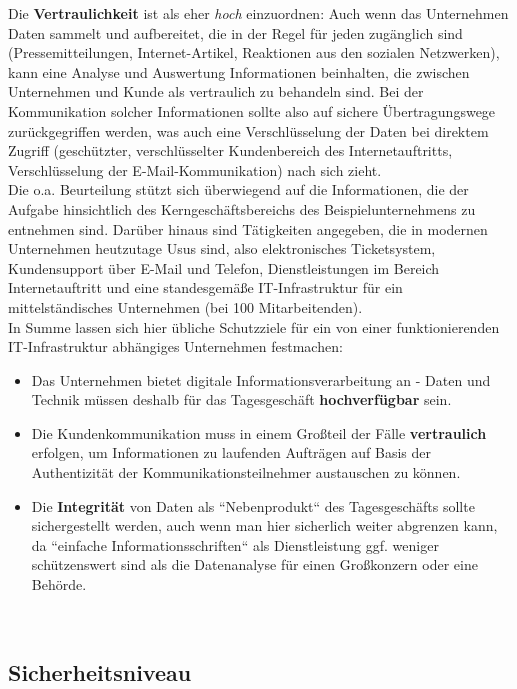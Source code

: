 Die \textbf{Vertraulichkeit} ist als eher \textit{hoch} einzuordnen: Auch wenn das Unternehmen Daten sammelt und aufbereitet, die in der Regel für jeden zugänglich sind (Pressemitteilungen, Internet-Artikel, Reaktionen aus den sozialen Netzwerken), kann eine Analyse und Auswertung Informationen beinhalten, die zwischen Unternehmen und Kunde als vertraulich zu behandeln sind.
Bei der Kommunikation solcher Informationen sollte also auf sichere Übertragungswege zurückgegriffen werden, was auch eine Verschlüsselung der Daten bei direktem Zugriff (geschützter, verschlüsselter Kundenbereich des Internetauftritts, Verschlüsselung der E-Mail-Kommunikation) nach sich zieht.\\

Die o.a. Beurteilung stützt sich überwiegend auf die Informationen, die der Aufgabe hinsichtlich des Kerngeschäftsbereichs des Beispielunternehmens zu entnehmen sind. Darüber hinaus sind Tätigkeiten angegeben, die in modernen Unternehmen heutzutage Usus sind, also elektronisches Ticketsystem, Kundensupport über E-Mail und Telefon, Dienstleistungen im Bereich Internetauftritt und eine standesgemäße IT-Infrastruktur für ein mittelständisches Unternehmen (bei 100 Mitarbeitenden).\\
In Summe lassen sich hier übliche Schutzziele für ein von einer funktionierenden IT-Infrastruktur abhängiges Unternehmen festmachen:
\begin{itemize}
\itemsep0.5em
\item Das Unternehmen bietet digitale Informationsverarbeitung an - Daten und Technik müssen deshalb für das Tagesgeschäft \textbf{hochverfügbar} sein.
\item Die Kundenkommunikation muss in einem Großteil der Fälle \textbf{vertraulich} erfolgen, um Informationen zu laufenden Aufträgen auf Basis der Authentizität der Kommunikationsteilnehmer austauschen zu können.
\item Die \textbf{Integrität} von Daten als ``Nebenprodukt`` des Tagesgeschäfts sollte sichergestellt werden, auch wenn man hier sicherlich weiter abgrenzen kann, da ``einfache Informationsschriften`` als Dienstleistung ggf. weniger schützenswert sind als die Datenanalyse für einen Großkonzern oder eine Behörde.
\end{itemize}\\

\subsection*{Sicherheitsniveau}


